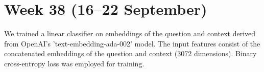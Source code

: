 \documentclass[11pt]{article}
\begin{document}
\section{Week 38 (16--22 September)}
\label{sec:week38}

We trained a linear classifier on embeddings of the question and context derived from OpenAI's 'text-embedding-ada-002' model. 
The input features consist of the concatenated embeddings of the question and context (3072 dimensions). 
Binary cross-entropy loss was employed for training.
\end{document}
